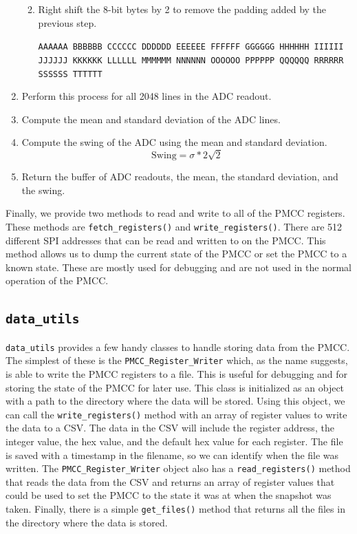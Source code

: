 \begin{enumerate}
\begin{enumerate}
{        \par}
        \item Right shift the 8-bit bytes by 2 to remove the padding added by the previous step.\\
        {\raggedright
        \texttt{AAAAAA BBBBBB CCCCCC DDDDDD EEEEEE FFFFFF GGGGGG HHHHHH IIIIII JJJJJJ KKKKKK LLLLLL MMMMMM NNNNNN OOOOOO PPPPPP QQQQQQ RRRRRR SSSSSS TTTTTT}
        \par}
    \end{enumerate} 
    \item Perform this process for all 2048 lines in the ADC readout.
    \item Compute the mean and standard deviation of the ADC lines. 
    \item Compute the swing of the ADC using the mean and standard deviation. 
    \begin{equation}
        \text{Swing} = \sigma * 2\sqrt{2}
    \end{equation}
    \item Return the buffer of ADC readouts, the mean, the standard deviation, and the swing.
\end{enumerate}

Finally, we provide two methods to read and write to all of the PMCC registers. 
These methods are \texttt{fetch\_registers()} and \texttt{write\_registers()}.
There are 512 different SPI addresses that can be read and written to on the PMCC.
This method allows us to dump the current state of the PMCC or set the PMCC to a known state.
These are mostly used for debugging and are not used in the normal operation of the PMCC.

\subsection{\texttt{data\_utils}}
\texttt{data\_utils} provides a few handy classes to handle storing data from the PMCC. 
The simplest of these is the \texttt{PMCC\_Register\_Writer} which, as the name suggests, is able to write the PMCC registers to a file. 
This is useful for debugging and for storing the state of the PMCC for later use.
This class is initialized as an object with a path to the directory where the data will be stored.
Using this object, we can call the \texttt{write\_registers()} method with an array of register values to write the data to a CSV. 
The data in the CSV will include the register address, the integer value, the hex value, and the default hex value for each register. 
The file is saved with a timestamp in the filename, so we can identify when the file was written. 
The \texttt{PMCC\_Register\_Writer} object also has a \texttt{read\_registers()} method that reads the data from the CSV and returns an array of register values that could be used to set the PMCC to the state it was at when the snapshot was taken. 
Finally, there is a simple \texttt{get\_files()} method that returns all the files in the directory where the data is stored.

